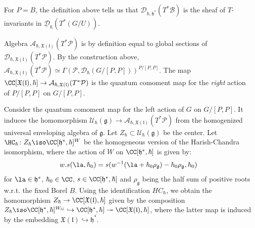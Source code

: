 \documentclass[12pt]{amsart}
\begin{document}
\begin{rmk}
For $P=B$, the definition above tells us that     $\mathcal{D}_{\hbar,\mathfrak{h}^*}(T^*\mathcal{B})$ is the sheaf of $T$-invariants in $\underline{\mathcal{D}}_{\hbar}(T^*(G/U))$.
\end{rmk}


Algebra $\mathcal{A}_{\hbar,\mathfrak{X}(\mathfrak{l})}(T^*\mathcal{P})$ is by definition equal to global sections of $\mathcal{D}_{\hbar,\mathfrak{X}(\mathfrak{l})}(T^*\mathcal{P})$. By the construction above,  $\mathcal{A}_{\hbar,\mathfrak{X}(\mathfrak{l})}(T^*\mathcal{P})\simeq \Gamma(\mathcal{P},\mathcal{D}_\hbar(G/[P,P]))^{P/[P,P]}$. The map $\CC[\mathfrak{X}(\mathfrak{l}),\hbar] \rightarrow \mathcal{A}_{\hbar,\mathfrak{X}(\mathfrak{l})}(T^*\mathcal{P})$ is the quantum comoment map for the {\emph{right}} action of $P/[P,P]$ on $G/[P,P]$.



Consider the quantum comoment map for the left action of $G$ on $G/[P,P]$. It induces the homomorphism $\mathcal{U}_\hbar(\mathfrak{g}) \rightarrow \mathcal{A}_{\hbar,\mathfrak{X}(\mathfrak{l})}(T^*\mathcal{P})$ from the homogenized universal enveloping algebra of $\mathfrak{g}$. Let $Z_\hbar \subset \mathcal{U}_\hbar(\mathfrak{g})$ be the center. Let $\HC_\hbar\colon Z_\hbar \iso \CC[\mathfrak{h}^*,\hbar]^{W}$ be the homogeneous version of the Harish-Chandra isomorphism, where the action of $W$ on $\CC[\mathfrak{h}^*,\hbar]$ is given by: 
\begin{equation}\label{rho_shifted_action_hbar}
w.s(\la,\hbar_0)=s(w^{-1}(\la+\hbar_0\rho_{\mathfrak{g}} )-\hbar_0\rho_{\mathfrak{g}},\hbar_0)
\end{equation}
for $\la \in \mathfrak{h}^*$, $\hbar_0\in \CC$, $s\in \CC[\mathfrak{h}^*,\hbar]$ and $\rho_{\mathfrak{g}}$ being the half sum of positive roots w.r.t. the fixed Borel $B$. Using the identification $HC_\hbar$, we obtain the homomorphism $Z_\hbar \rightarrow \CC[\mathfrak{X}(\mathfrak{l}),\hbar]$ given by the composition $Z_\hbar \iso \CC[\mathfrak{h}^*,\hbar]^{W_G} \hookrightarrow \CC[\mathfrak{h}^*,\hbar] \twoheadrightarrow \CC[\mathfrak{X}(\mathfrak{l}),\hbar]$, where the latter map is induced by the embedding $\mathfrak{X}(\mathfrak{l}) \hookrightarrow \mathfrak{h}^*$. 
\end{document}
